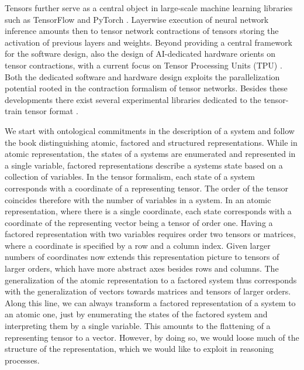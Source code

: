 Tensors further serve as a central object in large-scale machine learning libraries such as TensorFlow \cite{abadi_tensorflow_2016} and PyTorch \cite{paszke_pytorch_2019}.
Layerwise execution of neural network inference amounts then to tensor network contractions of tensors storing the activation of previous layers and weights.
Beyond providing a central framework for the software design, also the design of AI-dedicated hardware orients on tensor contractions, with a current focus on Tensor Processing Units (TPU) \cite{nikolic_survey_2022,jouppi_tpu_2023}.
Both the dedicated software and hardware design exploits the parallelization potential rooted in the contraction formalism of tensor networks.
Besides these developments there exist several experimental libraries dedicated to the tensor-train tensor format \cite{suess_mpnum_2017,wolf_libxerusxerus_2024,gels_pgelssscikit_tt_2025,puljak_tn4ml_2025}.


We start with ontological commitments in the description of a system and follow the book \cite{russell_artificial_2021} distinguishing atomic, factored and structured representations.
While in atomic representation, the states of a systems are enumerated and represented in a single variable, factored representations describe a systems state based on a collection of variables.
In the tensor formalism, each state of a system corresponds with a coordinate of a representing tensor.
The order of the tensor coincides therefore with the number of variables in a system.
In an atomic representation, where there is a single coordinate, each state corresponds with a coordinate of the representing vector being a tensor of order one.
Having a factored representation with two variables requires order two tensors or matrices, where a coordinate is specified by a row and a column index.
Given larger numbers of coordinates now extends this representation picture to tensors of larger orders, which have more abstract axes besides rows and columns.
The generalization of the atomic representation to a factored system thus corresponds with the generalization of vectors towards matrices and tensors of larger orders.
Along this line, we can always transform a factored representation of a system to an atomic one, just by enumerating the states of the factored system and interpreting them by a single variable.
This amounts to the flattening of a representing tensor to a vector.
However, by doing so, we would loose much of the structure of the representation, which we would like to exploit in reasoning processes.

